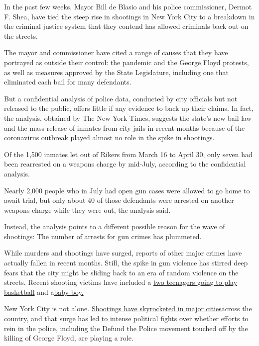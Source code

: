 In the past few weeks, Mayor Bill de Blasio and his police commissioner,
Dermot F. Shea, have tied the steep rise in shootings in New York City
to a breakdown in the criminal justice system that they contend has
allowed criminals back out on the streets.

The mayor and commissioner have cited a range of causes that they have
portrayed as outside their control: the pandemic and the George Floyd
protests, as well as measures approved by the State Legislature,
including one that eliminated cash bail for many defendants.

But a confidential analysis of police data, conducted by city officials
but not released to the public, offers little if any evidence to back up
their claims. In fact, the analysis, obtained by The New York Times,
suggests the state's new bail law and the mass release of inmates from
city jails in recent months because of the coronavirus outbreak played
almost no role in the spike in shootings.

Of the 1,500 inmates let out of Rikers from March 16 to April 30, only
seven had been rearrested on a weapons charge by mid-July, according to
the confidential analysis.

Nearly 2,000 people who in July had open gun cases were allowed to go
home to await trial, but only about 40 of those defendants were arrested
on another weapons charge while they were out, the analysis said.

Instead, the analysis points to a different possible reason for the wave
of shootings: The number of arrests for gun crimes has plummeted.

While murders and shootings have surged, reports of other major crimes
have actually fallen in recent months. Still, the spike in gun violence
has stirred deep fears that the city might be sliding back to an era of
random violence on the streets. Recent shooting victims have included a
\href{https://www.nytimes.com/2020/07/27/nyregion/nyc-shootings-weekend.html?searchResultPosition=1}{two
teenagers going to play basketball} and
a\href{https://www.nytimes.com/2020/07/13/nyregion/Davell-Gardner-brooklyn-shooting.html?searchResultPosition=9}{baby
boy.}

New York City is not alone.
\href{https://www.nytimes.com/2020/07/05/us/chicago-shootings.html?searchResultPosition=6}{Shootings
have skyrocketed in major cities}across the country, and that surge has
led to intense political fights over whether efforts to rein in the
police, including the Defund the Police movement touched off by the
killing of George Floyd, are playing a role.

